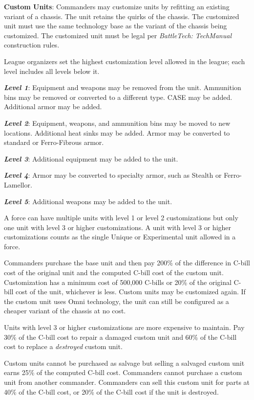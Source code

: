\item {\bfseries Custom Units}: Commanders may customize units by refitting an existing variant of a chassis.
The unit retains the quirks of the chassis.
The customized unit must use the same technology base as the variant of the chassis being customized.
The customized unit must be legal per \emph{BattleTech: TechManual} construction rules.

League organizers  set the highest customization level allowed in the league; each level includes all levels below it.

\begin{description}

\item \emph{\bfseries Level 1}: Equipment and weapons may be removed from the unit.
Ammunition bins may be removed or converted to a different type.
CASE may be added.
Additional armor may be added.

\item \emph{\bfseries Level 2}: Equipment, weapons, and ammunition bins may be moved to new locations.
Additional heat sinks may be added.
Armor may be converted to standard or Ferro-Fibrous armor.

\item \emph{\bfseries Level 3}: Additional equipment may be added to the unit.

\item \emph{\bfseries Level 4}: Armor may be converted to specialty armor, such as Stealth or Ferro-Lamellor.

\item \emph{\bfseries Level 5}: Additional weapons may be added to the unit.

\end{description}

A force can have multiple units with level 1 or level 2 customizations but only one unit with level 3 or higher customizations.
A unit with level 3 or higher customizations counts as the single Unique or Experimental unit allowed in a force.

Commanders purchase the base unit and then pay 200\% of the difference in C-bill cost of the original unit and the computed C-bill cost of the custom unit.
Customization has a minimum cost of 500,000 C-bills or 20\% of the original C-bill cost of the unit, whichever is less.
Custom units may be customized again.
If the custom unit uses Omni technology, the unit can still be configured as a cheaper variant of the chassis at no cost.

Units with level 3 or higher customizations are more expensive to maintain.
Pay 30\% of the C-bill cost to repair a damaged custom unit and 60\% of the C-bill cost to replace a \emph{destroyed} custom unit.

Custom units cannot be purchased as salvage but selling a salvaged custom unit earns 25\% of the computed C-bill cost.
Commanders cannot purchase a custom unit from another commander.
Commanders can sell this custom unit for parts at 40\% of the C-bill cost, or 20\% of the C-bill cost if the unit is destroyed.
